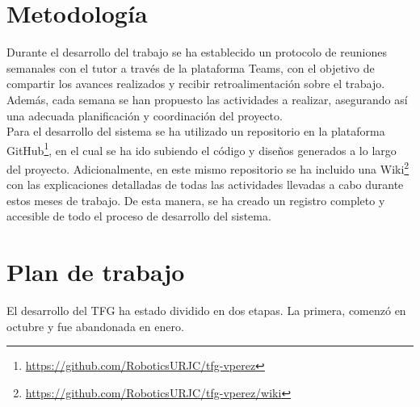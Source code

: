 \section{Metodología}
\label{sec:metodologia}

Durante el desarrollo del trabajo se ha establecido un protocolo de reuniones semanales con el tutor a 
través de la plataforma Teams, con el objetivo de compartir los avances realizados y recibir retroalimentación 
sobre el trabajo. Además, cada semana se han propuesto las actividades a realizar, asegurando así una adecuada 
planificación y coordinación del proyecto. \\
Para el desarrollo del sistema se ha utilizado un repositorio en la plataforma GitHub\footnote{\url{https://github.com/RoboticsURJC/tfg-vperez}}, en el cual se ha ido
subiendo el código y diseños generados a lo largo del proyecto. Adicionalmente, en este mismo repositorio 
se ha incluido una Wiki\footnote{\url{https://github.com/RoboticsURJC/tfg-vperez/wiki}} con las explicaciones detalladas de todas las actividades llevadas a cabo durante estos 
meses de trabajo. De esta manera, se ha creado un registro completo y accesible de todo el proceso de desarrollo del sistema.

\section{Plan de trabajo}
\label{sec:plantrabajo}
El desarrollo del TFG ha estado dividido en dos etapas. La primera, comenzó en octubre y fue abandonada en enero. 

